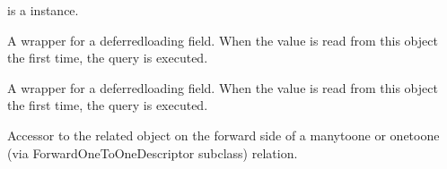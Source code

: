 \documentclass[letterpaper,10pt,english]{sphinxmanual}
\begin{document}
\begin{fulllineitems}
\begin{fulllineitems}
\sphinxAtStartPar
{} is a  instance.

\end{fulllineitems}


\begin{fulllineitems}
\label{\detokenize{courses:courses.models.Curriculum.theme_id}}
\pysigstartsignatures
\pysigline
{}
\pysigstopsignatures
\end{fulllineitems}


\begin{fulllineitems}
\label{\detokenize{courses:id3}}
\pysigstartsignatures
\pysigline
{}
\pysigstopsignatures
\sphinxAtStartPar
A wrapper for a deferred\sphinxhyphen{}loading field. When the value is read from this
object the first time, the query is executed.

\end{fulllineitems}


\begin{fulllineitems}
\label{\detokenize{courses:courses.models.Curriculum.updated_at}}
\pysigstartsignatures
\pysigline
{}
\pysigstopsignatures
\sphinxAtStartPar
A wrapper for a deferred\sphinxhyphen{}loading field. When the value is read from this
object the first time, the query is executed.

\end{fulllineitems}


\begin{fulllineitems}
\label{\detokenize{courses:courses.models.Curriculum.updated_by}}
\pysigstartsignatures
\pysigline
{}
\pysigstopsignatures
\sphinxAtStartPar
Accessor to the related object on the forward side of a many\sphinxhyphen{}to\sphinxhyphen{}one or
one\sphinxhyphen{}to\sphinxhyphen{}one (via ForwardOneToOneDescriptor subclass) relation.


\end{fulllineitems}
\end{fulllineitems}
\end{document}
